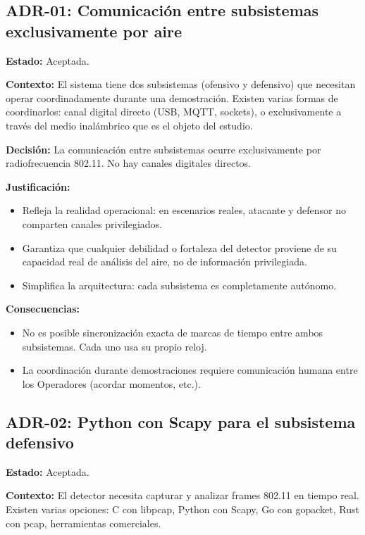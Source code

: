 \documentclass[11pt,a4paper]{article}
\begin{document}
\subsection{ADR-01: Comunicación entre subsistemas exclusivamente por aire}

\textbf{Estado:} Aceptada.

\textbf{Contexto:} El sistema tiene dos subsistemas (ofensivo y defensivo)
que necesitan operar coordinadamente durante una demostración. Existen
varias formas de coordinarlos: canal digital directo (USB, MQTT,
sockets), o exclusivamente a través del medio inalámbrico que es el
objeto del estudio.

\textbf{Decisión:} La comunicación entre subsistemas ocurre
exclusivamente por radiofrecuencia 802.11. No hay canales digitales
directos.

\textbf{Justificación:}

\begin{itemize}
  \item Refleja la realidad operacional: en escenarios reales, atacante y
    defensor no comparten canales privilegiados.
  \item Garantiza que cualquier debilidad o fortaleza del detector
    proviene de su capacidad real de análisis del aire, no de información
    privilegiada.
  \item Simplifica la arquitectura: cada subsistema es completamente
    autónomo.
\end{itemize}

\textbf{Consecuencias:}

\begin{itemize}
  \item No es posible sincronización exacta de marcas de tiempo entre
    ambos subsistemas. Cada uno usa su propio reloj.
  \item La coordinación durante demostraciones requiere comunicación
    humana entre los Operadores (acordar momentos, etc.).
\end{itemize}

\subsection{ADR-02: Python con Scapy para el subsistema defensivo}

\textbf{Estado:} Aceptada.

\textbf{Contexto:} El detector necesita capturar y analizar frames
802.11 en tiempo real. Existen varias opciones: C con libpcap, Python
con Scapy, Go con gopacket, Rust con pcap, herramientas comerciales.
\end{document}
